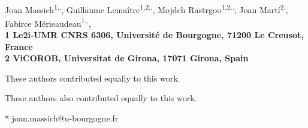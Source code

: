 \vspace*{0.35in}

\begin{flushleft}
{\Large
\textbf{}
}
\newline
\\
Joan Massich\textsuperscript{1,\Yinyang,},%
Guillaume Lema\^{i}tre\textsuperscript{1,2,\Yinyang,},%
Mojdeh Rastrgoo\textsuperscript{1,2,\Yinyang,},%
Joan Mart\'{i}\textsuperscript{2,},%
Fabirce M\'{e}rieaudeau\textsuperscript{1,\ddag,},%
\\
\bigskip
\bf{1} Le2i-UMR CNRS 6306, Universit\'{e} de Bourgogne, 71200 Le Creusot, France
\\
\bf{2} ViCOROB, Universitat de Girona, 17071 Girona, Spain
\\
\bigskip

%
%
\Yinyang These authors contributed equally to this work.

\ddag These authors also contributed equally to this work.




* joan.massich@u-bourgogne.fr

\end{flushleft}

